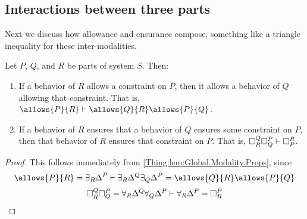 \subsection{Interactions between three parts}
    Next we discuss how allowance and ensurance compose, something like a triangle inequality for these inter-modalities.
    \begin{prop}[Composition]
    Let $P$, $Q$, and $R$ be parts of system $S$. Then:
    \begin{enumerate}
        \item If a behavior of $R$ allows a constraint on $P$, then it allows a behavior of $Q$ allowing that constraint. That is, $\allows{P}{R} \vdash \allows{Q}
        {R}  \allows{P}{Q}$.
        \item If a behavior of $R$ ensures that a behavior of $Q$ ensures some constraint on $P$, then that behavior of $R$ ensures that constraint on $P$. That is, $\ensure{Q}{R}\ensure{P}{Q} \vdash \ensure{R}{P}$.
    \end{enumerate}
    \end{prop}
    \begin{proof}
    This follows immediately from \cref{Thing:lem:Global.Modality.Props}, since 
    \[
    \allows{P}{R} = \exists_R \Delta^P \vdash \exists_R \Delta^Q \exists_Q \Delta^P = \allows{Q}{R}\allows{P}{Q}
    \]
    \[
    \ensure{Q}{R}\ensure{P}{Q} = \forall_R \Delta^Q \forall_Q \Delta^P \vdash \forall_R \Delta^P = \ensure{P}{R} \qedhere
    \]
    \end{proof}
    

